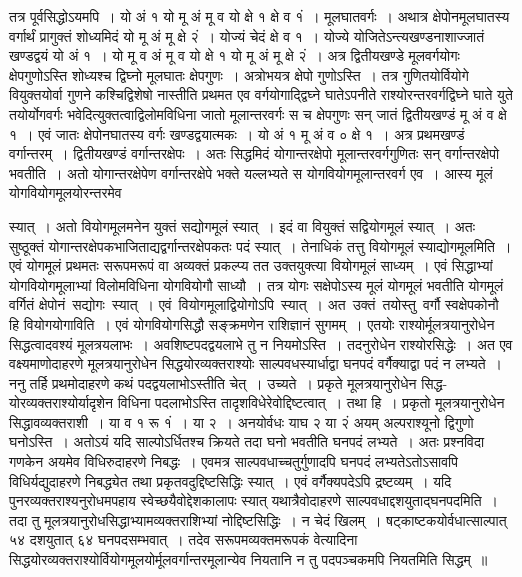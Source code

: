 \documentclass[11pt, openany]{book}
\begin{document}
\vspace{-3mm}
 तत्र पूर्वसिद्धोऽयमपि~। यो अं १ यो मू अं मू व यो क्षे १ क्षे व १ं~। 
मूलघातवर्गः~। अथात्र क्षेपोनमूलघातस्य वर्गार्थं प्रागुक्तं शोध्यमिदं यो मू अं मू क्षे २ं~। योज्यं चेदं क्षे व १~। योज्ये योजितेऽन्त्यखण्डनाशाज्जातं खण्डद्वयं यो अं १~। यो मू व अं मू व यो क्षे १ यो मू अं मू क्षे २ं~। अत्र द्वितीयखण्डे मूलवर्गयोगः क्षेपगुणोऽस्ति शोध्यश्च द्विघ्नो मूलघातः क्षेपगुणः~। अत्रोभयत्र क्षेपो गुणोऽस्ति~। तत्र 
गुणितयोर्वियोगे वियुक्तयोर्वा गुणने कश्चिद्विशेषो नास्तीति प्रथमत एव 
वर्गयोगाद्द्विघ्ने घातेऽपनीते राश्योरन्तरवर्गद्विघ्ने घाते युते तयोर्योगवर्गः भवेदित्युक्तत्वाद्विलोमविधिना जातो मूलान्तरवर्गः स च क्षेपगुणः सन् जातं
द्वितीयखण्डं मू अं व क्षे १~। एवं जातः क्षेपोनघातस्य वर्गः 
खण्डद्वयात्मकः~। यो अं १ मू अं व ० क्षे १~। अत्र प्रथमखण्डं वर्गान्तरम्~।
द्वितीयखण्डं वर्गान्तरक्षेपः~। अतः सिद्धमिदं योगान्तरक्षेपो मूलान्तरवर्गगुणितः 
सन् वर्गान्तरक्षेपो भवतीति~। अतो योगान्तरक्षेपेण वर्गान्तरक्षेपे भक्ते 
यल्लभ्यते स योगवियोगमूलान्तरवर्ग एव~। आस्य मूलं योगवियोगमूलयोरन्तरमेव
\newpage

\noindent स्यात्~। अतो वियोगमूलमनेन युक्तं सद्योगमूलं स्यात्~। इदं वा वियुक्तं सद्वियोगमूलं स्यात्~। अतः सुष्ठूक्तं योगान्तरक्षेपकभाजिताद्यद्वर्गान्तरक्षेपकतः 
पदं स्यात्~। तेनाधिकं तत्तु वियोगमूलं स्याद्योगमूलमिति~। एवं योगमूलं
प्रथमतः सरूपमरूपं वा अव्यक्तं प्रकल्प्य तत उक्तयुक्त्या वियोगमूलं 
साध्यम्~। एवं सिद्धाभ्यां योगवियोगमूलाभ्यां विलोमविधिना योगवियोगौ 
साध्यौ~। तत्र योगः सक्षेपोऽस्य मूलं योगमूलं भवतीति योगमूलं वर्गितं 
क्षेपोनं \,सद्योगः \,स्यात्~। एवं \,वियोगमूलाद्वियोगोऽपि \,स्यात्~। अत \,उक्तं \,तयोस्तु \,वर्गौ स्वक्षेपकोनौ हि वियोगयोगाविति~। एवं योगवियोगसिद्धौ 
सङ्क्रमणेन राशिज्ञानं सुगमम्~। एतयोः राश्योर्मूलत्रयानुरोधेन
सिद्धत्वादवश्यं मूलत्रयलाभः~। अवशिष्टपदद्वयलाभे तु न नियमोऽस्ति~। तदनुरोधेन 
राश्योरसिद्धेः~। अत एव वक्ष्यमाणोदाहरणे मूलत्रयानुरोधेन सिद्धयोरव्यक्तराश्योः साल्पवधस्यार्धाद्वा घनपदं वर्गैक्याद्वा पदं न लभ्यते~। ननु तर्हि 
प्रथमोदाहरणे कथं पदद्वयलाभोऽस्तीति चेत्~। उच्यते~। प्रकृते 
मूलत्रयानुरोधेन सिद्ध-योरव्यक्तराश्योर्यादृशेन विधिना पदलाभोऽस्ति तादृशविधेरेवोद्दिष्टत्वात्~। तथा हि~। प्रकृतो मूलत्रयानुरोधेन
सिद्धावव्यक्तराशी~। या व १ रू १ं~। या २~। अनयोर्वधः याघ २ या २ं अयम् अल्पराश्यूनो द्विगुणो घनोऽस्ति~। अतोऽयं यदि साल्पोऽर्धितश्च क्रियते 
तदा घनो भवतीति घनपदं लभ्यते~। अतः प्रश्नविदा गणकेन 
अयमेव विधिरुदाहरणे निबद्धः~। एवमत्र साल्पवधाच्चतुर्गुणादपि घनपदं 
लभ्यतेऽतोऽसावपि विधिर्यद्युदाहरणे निबद्ध्येत तथा प्रकृतवदुद्दिष्टसिद्धिः 
स्यात्~। एवं वर्गैक्यपदेऽपि द्रष्टव्यम्~। यदि पुनरव्यक्तराश्यनुरोधमपहाय 
स्वेच्छयैवोद्देशकालापः स्यात् यथात्रैवोदाहरणे साल्पवधाद्दशयुताद्घनपदमिति~। 
तदा तु मूलत्रयानुरोधसिद्धाभ्यामव्यक्तराशिभ्यां नोद्दिष्टसिद्धिः~। न चेदं
खिलम्~। षट्काष्टकयोर्वधात्साल्पात् ५४ दशयुतात् ६४ घनपदसम्भवात्~। 
तदेव सरूपमव्यक्तमरूपकं वेत्यादिना सिद्धयोरव्यक्तराश्योर्वियोगमूलयोर्मूलवर्गान्तरमूलान्येव नियतानि न तु पदपञ्चकमपि नियतमिति सिद्धम्~॥
\newpage
\end{document}
